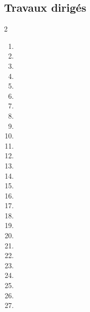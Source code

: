 \documentclass[12pt,fancy]{cours}
\begin{document}
\subsection{Travaux dirigés}
\begin{multicols}{2}
\begin{enumerate}[label=\small\color{coolblack}\faPen]
      \item {}
      \item {}
      \item {}
      \item {}
      \item {}
      \item {}
      \item {}
      \item {}
      \item {}
      \item {}
      \item {}
      \item {}
      \item {}
      \item {}
      \item {}
      \item {}
      \item {}
      \item {}
      \item {}
      \item {}
      \item {}
      \item {}
      \item {}
      \item {}
      \item {}
      \item {}
      \item {}
\end{enumerate}
\end{multicols}
\end{document}
